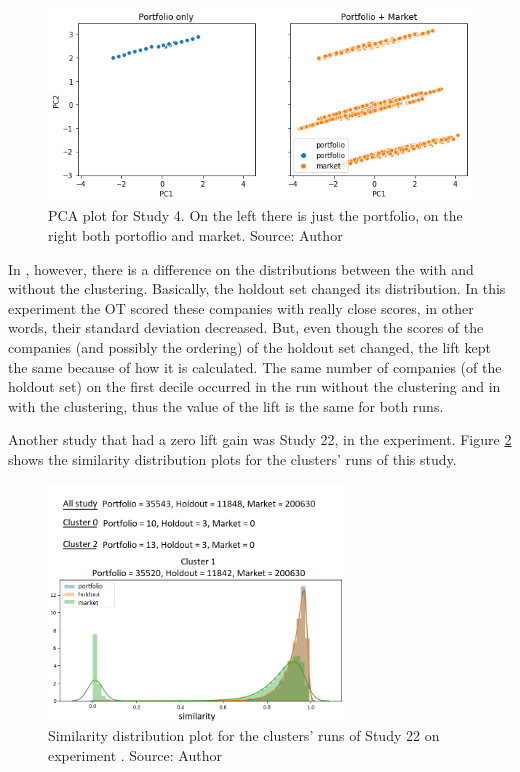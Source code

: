 \begin{figure}[!ht]
   \centering
   \includegraphics[width=\linewidth]{fig/ch4-study-4-pca-plot.png}
   \caption{PCA plot for Study 4. On the left there is just the portfolio, on the right both portoflio and market. Source: Author}
   \label{fig:study-4-pca-plot}
\end{figure}

In \nameExperimentII{}, however, there is a difference on the distributions between the with and without the clustering. Basically, the holdout set changed its distribution. In this experiment the OT scored these companies with really close scores, in other words, their standard deviation decreased. But, even though the scores of the companies (and possibly the ordering) of the holdout set changed, the lift kept the same because of how it is calculated. The same number of companies (of the holdout set) on the first decile occurred in the run without the clustering and in with the clustering, thus the value of the lift is the same for both runs.

Another study that had a zero lift gain was Study 22, in the \nameExperimentI{} experiment. Figure \ref{fig:study-22-clusters-simi-plot} shows the similarity distribution plots for the clusters' runs of this study.

\begin{figure}[!ht]
   \centering
   \includegraphics[width=8cm   ]{fig/ch4-study-22-clusters-simi-plot.png}
   \caption{Similarity distribution plot for the clusters' runs of Study 22 on experiment \nameExperimentI{}. Source: Author}
   \label{fig:study-22-clusters-simi-plot}
\end{figure}

